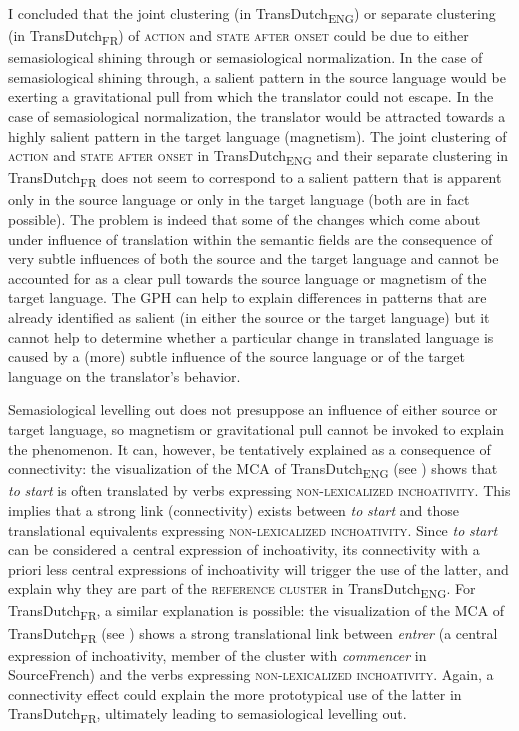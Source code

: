 I concluded that the joint clustering (in TransDutch\textsubscript{ENG}) or separate clustering (in TransDutch\textsubscript{FR}) of \textsc{action} and \textsc{state after onset} could be due to either semasiological shining through or semasiological normalization. In the case of semasiological shining through, a salient pattern in the source language would be exerting a gravitational pull from which the translator could not escape. In the case of semasiological normalization, the translator would be attracted towards a highly salient pattern in the target language (magnetism). The joint clustering of \textsc{action} and \textsc{state after onset} in TransDutch\textsubscript{ENG} and their separate clustering in TransDutch\textsubscript{FR} does not seem to correspond to a salient pattern that is apparent only in the source language or only in the target language (both are in fact possible). The problem is indeed that some of the changes which come about under influence of translation within the semantic fields are the consequence of very subtle influences of both the source and the target language and cannot be accounted for as a clear pull towards the source language or magnetism of the target language. The GPH can help to explain differences in patterns that are already identified as salient (in either the source or the target language) but it cannot help to determine whether a particular change in translated language is caused by a (more) subtle influence of the source language or of the target language on the translator’s behavior.

Semasiological levelling out does not presuppose an influence of either source or target language, so magnetism or gravitational pull cannot be invoked to explain the phenomenon. It can, however, be tentatively explained as a consequence of connectivity: the visualization of the MCA of TransDutch\textsubscript{ENG} (see ) shows that \textit{to} \textit{start} is often translated by verbs expressing \textsc{non-lexicalized inchoativity}. This implies that a strong link (connectivity) exists between \textit{to} \textit{start} and those translational equivalents expressing \textsc{non-lexicalized inchoativity}. Since \textit{to} \textit{start} can be considered a central expression of inchoativity, its connectivity with a priori less central expressions of inchoativity will trigger the use of the latter, and explain why they are part of the \textsc{reference cluster} in TransDutch\textsubscript{ENG}. For TransDutch\textsubscript{FR}, a similar explanation is possible: the visualization of the MCA of TransDutch\textsubscript{FR} (see ) shows a strong translational link between \textit{entrer} (a central expression of inchoativity, member of the cluster with \textit{commencer} in SourceFrench) and the verbs expressing \textsc{non-lexicalized inchoativity}. Again, a connectivity effect could explain the more prototypical use of the latter in TransDutch\textsubscript{FR}, ultimately leading to semasiological levelling out.


